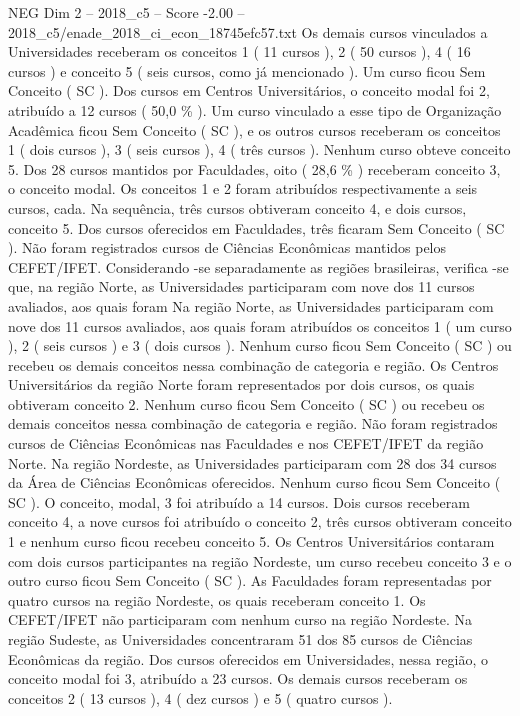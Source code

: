 \begin{textsample}{NEG Dim 2 – 2018\_c5 – Score -2.00 – 2018\_c5/enade\_2018\_ci\_econ\_18745efc57.txt}
Os demais cursos vinculados a Universidades receberam os conceitos 1 ( 11 cursos ), 2 ( 50 cursos ), 4 ( 16 cursos ) e conceito 5 ( seis cursos, como já mencionado ).
Um curso ficou Sem Conceito ( SC ).
Dos cursos em Centros Universitários, o conceito modal foi 2, atribuído a 12 cursos ( 50,0 \% ).
Um curso vinculado a esse tipo de Organização Acadêmica ficou Sem Conceito ( SC ), e os outros cursos receberam os conceitos 1 ( dois cursos ), 3 ( seis cursos ), 4 ( três cursos ).
Nenhum curso obteve conceito 5.
Dos 28 cursos mantidos por Faculdades, oito ( 28,6 \% ) receberam conceito 3, o conceito modal.
Os conceitos 1 e 2 foram atribuídos respectivamente a seis cursos, cada.
Na sequência, três cursos obtiveram conceito 4, e dois cursos, conceito 5.
Dos cursos oferecidos em Faculdades, três ficaram Sem Conceito ( SC ).
Não foram registrados cursos de Ciências Econômicas mantidos pelos CEFET/IFET.
Considerando -se separadamente as regiões brasileiras, verifica -se que, na região Norte, as Universidades participaram com nove dos 11 cursos avaliados, aos quais foram Na região Norte, as Universidades participaram com nove dos 11 cursos avaliados, aos quais foram atribuídos os conceitos 1 ( um curso ), 2 ( seis cursos ) e 3 ( dois cursos ).
Nenhum curso ficou Sem Conceito ( SC ) ou recebeu os demais conceitos nessa combinação de categoria e região.
Os Centros Universitários da região Norte foram representados por dois cursos, os quais obtiveram conceito 2.
Nenhum curso ficou Sem Conceito ( SC ) ou recebeu os demais conceitos nessa combinação de categoria e região.
Não foram registrados cursos de Ciências Econômicas nas Faculdades e nos CEFET/IFET da região Norte.
Na região Nordeste, as Universidades participaram com 28 dos 34 cursos da Área de Ciências Econômicas oferecidos.
Nenhum curso ficou Sem Conceito ( SC ).
O conceito, modal, 3 foi atribuído a 14 cursos.
Dois cursos receberam conceito 4, a nove cursos foi atribuído o conceito 2, três cursos obtiveram conceito 1 e nenhum curso ficou recebeu conceito 5.
Os Centros Universitários contaram com dois cursos participantes na região Nordeste, um curso recebeu conceito 3 e o outro curso ficou Sem Conceito ( SC ).
As Faculdades foram representadas por quatro cursos na região Nordeste, os quais receberam conceito 1.
Os CEFET/IFET não participaram com nenhum curso na região Nordeste.
Na região Sudeste, as Universidades concentraram 51 dos 85 cursos de Ciências Econômicas da região.
Dos cursos oferecidos em Universidades, nessa região, o conceito modal foi 3, atribuído a 23 cursos.
Os demais cursos receberam os conceitos 2 ( 13 cursos ), 4 ( dez cursos ) e 5 ( quatro cursos ).

\end{textsample}

